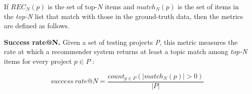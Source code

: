 If $REC_{N}(p)$ is the set of top-$N$ items and $match_{N}(p)$ is the set of items in the \emph{top-N} list that match with those in the ground-truth data, then the metrics are defined as follows.  

\vspace{.1cm}
\noindent\textbf{Success rate@N.} Given a set of testing projects \emph{P}, this metric measures the rate at which a recommender system returns at least a topic match among \emph{top-N} items for every project $p \in P$ \cite{6671293}: %
\vspace{-.1cm}

\begin{equation} \label{eqn:RecallRate}
success\ rate@N=\frac{ count_{p \in P}( \left | match_{N}(p) \right | > 0 ) }{\left | P \right |} %
\end{equation}

\vspace{.1cm}
\vspace{.1cm}




%
%

